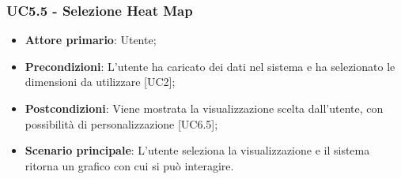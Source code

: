\subsubsection{UC5.5 - Selezione Heat Map}
\begin{itemize}
	\item \textbf{Attore primario}: Utente;
	\item \textbf{Precondizioni}: L'utente ha caricato dei dati nel sistema e ha selezionato le dimensioni da utilizzare [UC2];
	\item \textbf{Postcondizioni}: Viene mostrata la visualizzazione  scelta dall'utente, con possibilità di personalizzazione [UC6.5];
	\item \textbf{Scenario principale}: L'utente seleziona la visualizzazione  e il sistema ritorna un grafico con cui si può interagire.

\end{itemize}
